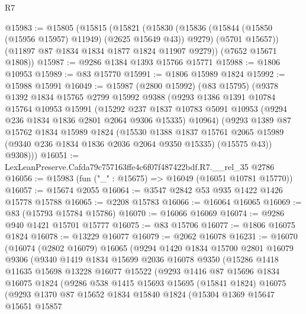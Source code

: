\begin{lexlean}{R7}
\begin{coremodule}
@15983 := @15805
    (@15815
      (@15821
        (@15830
          (@15836 (@15844 (@15850 (@15956 @15957) @11949) (@2625 @15649 @43)) @9279)
          (@5701 @15657))
        (@11897 @87 @1834 @1834 @1877 @1824 @11907 @9279))
      (@7652 @15671 @1808))
@15987 := @9286 @1384 @1393 @15766 @15771
@15988 := @1806 @10953
@15989 := @83 @15770
@15991 := @1806 @15989 @1824
@15992 := @15988 @15991
@16049 := @15987
    (@2800 @15992)
    (@83 @15795)
    (@9378
      @1392
      @1834
      @15765
      @2799
      @15992
      @9388
      (@9293
        @1386
        @1391
        @10784
        @15764
        @10953
        @15991
        (@15292
          @237
          @1837
          @10783
          @5091
          @10953
          (@9294 @236 @1834 @1836 @2801 @2064 @9306 @15335)
          @10964)
        (@9293
          @1389
          @87
          @15762
          @1834
          @15989
          @1824
          (@15530
            @1388
            @1837
            @15761
            @2065
            @15989
            (@9340 @236 @1834 @1836 @2036 @2064 @9350 @15335)
            (@15575 @43))
          @9308)))
@16051 := LexLeanPreserve.Cafda79c757163ffe4c6f07f487422bdf.R7.__rel_35 @2786
@16056 := @15983 (fun ("_" : @15675) => @16049 (@16051 @10781 @15770))
@16057 := @15674 @2055
@16064 := @3547 @2842 @53 @935 @1422 @1426 @15778 @15788
@16065 := @2208 @15783
@16066 := @16064 @16065
@16069 := @83 (@15793 @15784 @15786)
@16070 := @16066 @16069
@16074 := @9286 @940 @1421 @15701 @15777
@16075 := @83 @15706
@16077 := @1806 @16075 @1824
@16078 := @13229 @16077
@16079 := @2062 @16078
@16231 := @16070
    (@16074
      (@2802 @16079)
      @16065
      (@9294
        @1420
        @1834
        @15700
        @2801
        @16079
        @9306
        (@9340
          @1419
          @1834
          @15699
          @2036
          @16078
          @9350
          (@15286
            @1418
            @11635
            @15698
            @13228
            @16077
            @15522
            (@9293
              @1416
              @87
              @15696
              @1834
              @16075
              @1824
              (@9286
                @538
                @1415
                @15693
                @15695
                (@15841 @1824)
                @16075
                (@9293
                  @1370
                  @87
                  @15652
                  @1834
                  @15840
                  @1824
                  (@15304
                    @1369
                    @15647
                    @15651
                    @15857

\end{coremodule}
\end{lexlean}
